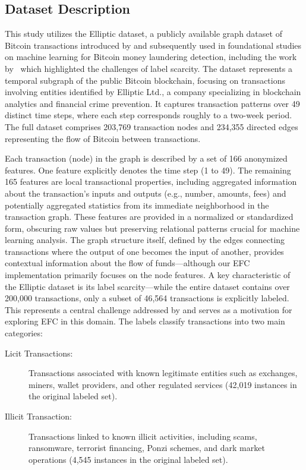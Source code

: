 \documentclass[12pt]{article}
\begin{document}
\subsection{Dataset Description} \label{subsec:dataset}
This study utilizes the Elliptic dataset, a publicly available graph dataset of Bitcoin transactions introduced by 
\cite{weber2019antimoneylaunderingbitcoinexperimenting} and subsequently used in foundational studies on machine
learning for Bitcoin money laundering detection, including the work by~\cite{lorenz2021machinelearningmethodsdetect}
which highlighted the challenges of label scarcity. The dataset represents a temporal subgraph of the public Bitcoin
blockchain, focusing on transactions involving entities identified by Elliptic Ltd., a company specializing in blockchain
analytics and financial crime prevention. It captures transaction patterns over 49 distinct time steps, where each step
corresponds roughly to a two-week period. The full dataset comprises 203,769 transaction nodes and 234,355 directed edges
representing the flow of Bitcoin between transactions.

Each transaction (node) in the graph is described by a set of 166 anonymized features. One feature explicitly denotes the
time step (1 to 49). The remaining 165 features are local transactional properties, including aggregated information about
the transaction's inputs and outputs (e.g., number, amounts, fees) and potentially aggregated statistics from its immediate
neighborhood in the transaction graph. These features are provided in a normalized or standardized form, obscuring raw
values but preserving relational patterns crucial for machine learning analysis. The graph structure itself, defined by
the edges connecting transactions where the output of one becomes the input of another, provides contextual information
about the flow of funds---although our EFC implementation primarily focuses on the
node features. A key characteristic of the Elliptic dataset is its label scarcity---while the entire dataset contains over
200,000 transactions, only a subset of 46,564 transactions is explicitly labeled. This represents a central challenge addressed by 
\cite{lorenz2021machinelearningmethodsdetect} and serves as a motivation for exploring EFC in this domain.  
The labels classify transactions into two main categories:

\begin{description}
    \item [Licit Transactions:] Transactions associated with known legitimate entities such as exchanges, miners, wallet providers,
      and other regulated services (42,019 instances in the original labeled set).
    \item [Illicit Transaction:] Transactions linked to known illicit activities, including scams, ransomware, terrorist financing,
      Ponzi schemes, and dark market operations (4,545 instances in the original labeled set).
\end{description}
\end{document}
